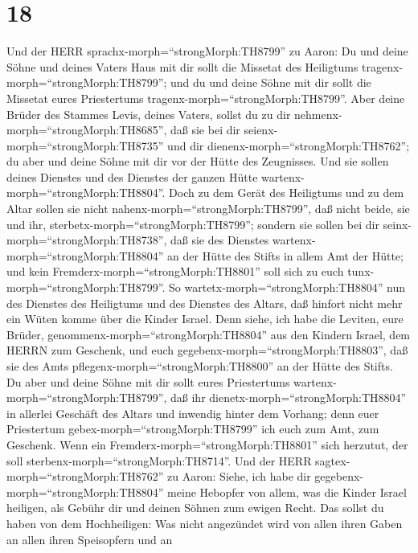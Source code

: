 \hypertarget{section-17}{%
\section{18}\label{section-17}}

 Und der HERR sprachx-morph=``strongMorph:TH8799'' zu Aaron:
Du und deine Söhne und deines Vaters Haus mit dir sollt die Missetat des
Heiligtums tragenx-morph=``strongMorph:TH8799''; und du und deine Söhne
mit dir sollt die Missetat eures Priestertums
tragenx-morph=``strongMorph:TH8799''.  Aber deine Brüder des
Stammes Levis, deines Vaters, sollst du zu dir
nehmenx-morph=``strongMorph:TH8685'', daß sie bei dir
seienx-morph=``strongMorph:TH8735'' und dir
dienenx-morph=``strongMorph:TH8762''; du aber und deine Söhne mit dir
vor der Hütte des Zeugnisses.  Und sie sollen deines
Dienstes und des Dienstes der ganzen Hütte
wartenx-morph=``strongMorph:TH8804''. Doch zu dem Gerät des Heiligtums
und zu dem Altar sollen sie nicht nahenx-morph=``strongMorph:TH8799'',
daß nicht beide, sie und ihr, sterbetx-morph=``strongMorph:TH8799'';
 sondern sie sollen bei dir
seinx-morph=``strongMorph:TH8738'', daß sie des Dienstes
wartenx-morph=``strongMorph:TH8804'' an der Hütte des Stifts in allem
Amt der Hütte; und kein Fremderx-morph=``strongMorph:TH8801'' soll sich
zu euch tunx-morph=``strongMorph:TH8799''.  So
wartetx-morph=``strongMorph:TH8804'' nun des Dienstes des Heiligtums und
des Dienstes des Altars, daß hinfort nicht mehr ein Wüten komme über die
Kinder Israel.  Denn siehe, ich habe die Leviten, eure
Brüder, genommenx-morph=``strongMorph:TH8804'' aus den Kindern Israel,
dem HERRN zum Geschenk, und euch gegebenx-morph=``strongMorph:TH8803'',
daß sie des Amts pflegenx-morph=``strongMorph:TH8800'' an der Hütte des
Stifts.  Du aber und deine Söhne mit dir sollt eures
Priestertums wartenx-morph=``strongMorph:TH8799'', daß ihr
dienetx-morph=``strongMorph:TH8804'' in allerlei Geschäft des Altars und
inwendig hinter dem Vorhang; denn euer Priestertum
gebex-morph=``strongMorph:TH8799'' ich euch zum Amt, zum Geschenk. Wenn
ein Fremderx-morph=``strongMorph:TH8801'' sich herzutut, der soll
sterbenx-morph=``strongMorph:TH8714''.  Und der HERR
sagtex-morph=``strongMorph:TH8762'' zu Aaron: Siehe, ich habe dir
gegebenx-morph=``strongMorph:TH8804'' meine Hebopfer von allem, was die
Kinder Israel heiligen, als Gebühr dir und deinen Söhnen zum ewigen
Recht.  Das sollst du haben von dem Hochheiligen: Was nicht
angezündet wird von allen ihren Gaben an allen ihren Speisopfern und an
